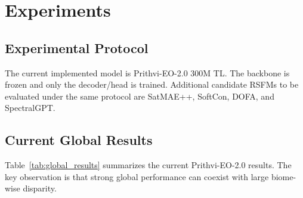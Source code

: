 
\section{Experiments}

\subsection{Experimental Protocol}
The current implemented model is Prithvi-EO-2.0 300M TL. The backbone is frozen and only the decoder/head is trained. Additional candidate RSFMs to be evaluated under the same protocol are SatMAE++, SoftCon, DOFA, and SpectralGPT.

\begin{table}[t]
\centering
\caption{Prithvi-EO-2.0 linear-probing setup used in the current experiments.}
\label{tab:training_config}
\end{table}

\subsection{Current Global Results}
Table~\ref{tab:global_results} summarizes the current Prithvi-EO-2.0 results. The key observation is that strong global performance can coexist with large biome-wise disparity.


